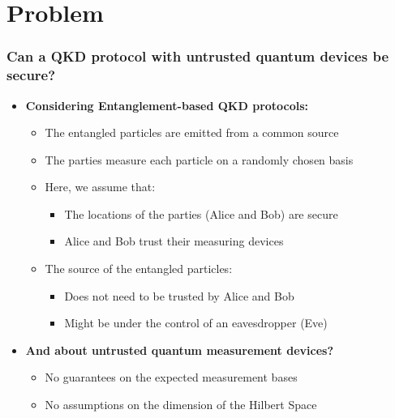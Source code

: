 \documentclass{beamer}
\begin{document}
\begin{frame}
		\end{frame}

  
	\section{Problem}

		\begin{frame}
			\frametitle{\normalsize Can a QKD protocol with untrusted quantum devices be secure?}

            \vspace{2.5ex}
            \begin{itemize}
                \item \textbf{Considering Entanglement-based QKD protocols:}
                \begin{itemize}\small
                    \item The entangled particles are emitted from a common source
                    \item The parties measure each particle on a randomly chosen basis
                    \vspace{0.5ex}
                    \item Here, we assume that:
                    \begin{itemize}
                        \item The locations of the parties (Alice and Bob) are secure
                        \item Alice and Bob trust their measuring devices
                    \end{itemize}
                    \vspace{0.5ex}
                    \item The source of the entangled particles:
                    \begin{itemize}
                        \item Does not need to be trusted by Alice and Bob
                        \item Might be under the control of an eavesdropper (Eve)
                    \end{itemize}
                \end{itemize}
                \vspace{1ex}
                \item \textbf{And about untrusted quantum measurement devices?}
                \vspace{-2.5ex}
                \begin{itemize}
                    \item No guarantees on the expected measurement bases
                    \item No assumptions on the dimension of the Hilbert Space
                \end{itemize}
            \end{itemize}
		\end{frame}
\end{document}
